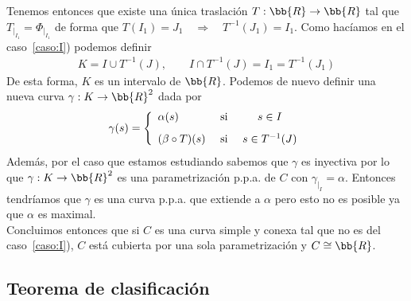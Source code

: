 \begin{observacion}
\begin{enumerate}
\begin{enumerate}
\begin{figure}[H]
%
            \end{figure}
            
            Tenemos entonces que existe una única traslación $T:\bb{R} \to \bb{R}$ tal que $T_{|_{I_1}} = \Phi_{|_{I_1}}$ de forma que $T(I_1)=J_1 \quad \Rightarrow \quad T^ {-1}(J_1) = I_1$. Como hacíamos en el caso~\ref{caso:I}) podemos definir
            \begin{gather*}
                K = I \cup T^{-1}(J), \qquad I\cap T^{-1}(J) = I_1 = T^{-1}(J_1)
            \end{gather*}
            De esta forma, $K$ es un intervalo de $\bb{R}$. Podemos de nuevo definir una nueva curva $\gamma : K \to \bb{R}^2$ dada por
            \begin{gather*}
                \gamma(s) =
                \left\{
                    \begin{array}{l c c}
                        \alpha(s) & \text{ si } & s \in I\\[0.8em]
                        (\beta \circ T)(s) & \text{ si } & s\in T^{-1}(J)
                    \end{array}
                \right.
            \end{gather*}
            Además, por el caso que estamos estudiando sabemos que $\gamma$ es inyectiva por lo que $\gamma : K \to \bb{R}^2$ es una parametrización p.p.a. de $C$ con $\gamma_{|_I} = \alpha$. Entonces tendríamos que $\gamma$ es una curva p.p.a. que extiende a $\alpha$ pero esto no es posible ya que $\alpha$ es maximal.\\

            Concluimos entonces que si $C$ es una curva simple y conexa tal que no es del caso~\ref{caso:I}), $C$ está cubierta por una sola parametrización y $C \cong \bb{R}$.
        \end{enumerate}
    \end{enumerate}
\end{observacion}

\subsection{Teorema de clasificación}

